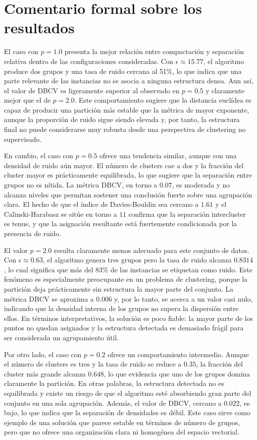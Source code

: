 \documentclass[11pt]{article}
\begin{document}
\section{Comentario formal sobre los resultados}

El caso con $p=1.0$ presenta la mejor relación entre compactación y separación relativa dentro de las configuraciones consideradas. Con $\epsilon \approx 15.77$, el algoritmo produce dos grupos y una tasa de ruido cercana al 51\%, lo que indica que una parte relevante de las instancias no se asocia a ninguna estructura densa. Aun así, el valor de DBCV es ligeramente superior al observado en $p=0.5$ y claramente mejor que el de $p=2.0$. Este comportamiento sugiere que la distancia euclídea es capaz de producir una partición más estable que la métrica de mayor exponente, aunque la proporción de ruido sigue siendo elevada y, por tanto, la estructura final no puede considerarse muy robusta desde una perspectiva de clustering no supervisado.

En cambio, el caso con $p=0.5$ ofrece una tendencia similar, aunque con una densidad de ruido aún mayor. El número de clusters cae a dos y la fracción del cluster mayor es prácticamente equilibrada, lo que sugiere que la separación entre grupos no es nítida. La métrica DBCV, en torno a $0.07$, es moderada y no alcanza niveles que permitan sostener una conclusión fuerte sobre una agrupación clara. El hecho de que el índice de Davies-Bouldin sea cercano a $1.61$ y el Calinski-Harabasz se sitúe en torno a $11$ confirma que la separación intercluster es tenue, y que la asignación resultante está fuertemente condicionada por la presencia de ruido.

El valor $p=2.0$ resulta claramente menos adecuado para este conjunto de datos. Con $\epsilon \approx 0.63$, el algoritmo genera tres grupos pero la tasa de ruido alcanza $0.8314$, lo cual significa que más del 83\% de las instancias se etiquetan como ruido. Este fenómeno es especialmente preocupante en un problema de clustering, porque la partición deja prácticamente sin estructura la mayor parte del conjunto. La métrica DBCV se aproxima a $0.006$ y, por lo tanto, se acerca a un valor casi nulo, indicando que la densidad interna de los grupos no supera la dispersión entre ellos. En términos interpretativos, la solución es poco fiable: la mayor parte de los puntos no quedan asignados y la estructura detectada es demasiado frágil para ser considerada un agrupamiento útil.

Por otro lado, el caso con $p=0.2$ ofrece un comportamiento intermedio. Aunque el número de clusters es tres y la tasa de ruido se reduce a $0.35$, la fracción del cluster más grande alcanza $0.648$, lo que evidencia que uno de los grupos domina claramente la partición. En otras palabras, la estructura detectada no es equilibrada y existe un riesgo de que el algoritmo esté absorbiendo gran parte del conjunto en una sola agrupación. Además, el valor de DBCV, cercano a $0.022$, es bajo, lo que indica que la separación de densidades es débil. Este caso sirve como ejemplo de una solución que parece estable en términos de número de grupos, pero que no ofrece una organización clara ni homogénea del espacio vectorial.
\end{document}
